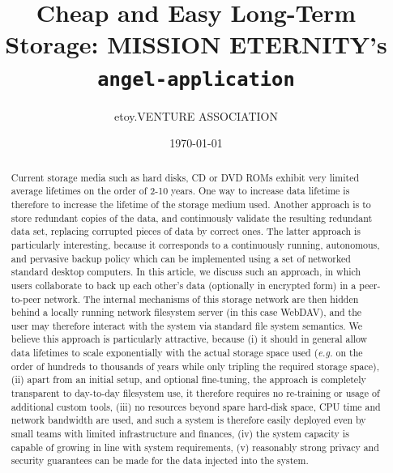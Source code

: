 \documentclass[11pt]{article}
\title{Cheap and Easy Long-Term Storage: MISSION ETERNITY's \texttt{angel-application}}
\author{etoy.VENTURE ASSOCIATION}
\date{\today}                                           %
\begin{document}
\maketitle
\begin{frontmatter}

\begin{abstract}
Current storage media such as hard disks, CD or DVD ROMs exhibit very limited average lifetimes on the order of 2-10 years. One way to increase data lifetime is therefore to increase the lifetime of the storage medium used. Another approach is to store redundant copies of the data, and continuously validate the resulting redundant data set, replacing corrupted pieces of data by correct ones.
The latter approach is particularly interesting, because it corresponds to a continuously running, autonomous, and pervasive backup policy which can be implemented using a set of networked standard desktop computers. In this article, we discuss such an approach, in which users collaborate to back up each other's data (optionally in encrypted form) in a peer-to-peer network. The internal mechanisms of this storage network are then hidden behind a locally running network filesystem server (in this case WebDAV), and the user may therefore interact with the system via standard file system semantics. We believe this approach is particularly attractive, because (i) it should in general allow data lifetimes to scale exponentially with the actual storage space used (\emph{e.g.} on the order of hundreds to thousands of years while only tripling the required storage space), (ii) apart from an initial setup, and optional fine-tuning, the approach is completely transparent to day-to-day filesystem use, it therefore requires no re-training or usage of additional custom tools, (iii) no resources beyond spare hard-disk space, CPU time and network bandwidth are used, and such a system is therefore easily deployed even by small teams with limited infrastructure and finances, (iv) the system capacity is capable of growing in line with system requirements, (v) reasonably strong privacy and security guarantees can be made for the data injected into the system.
\end{abstract}

\newpage

\tableofcontents


\end{frontmatter}
\newpage
\end{document}
